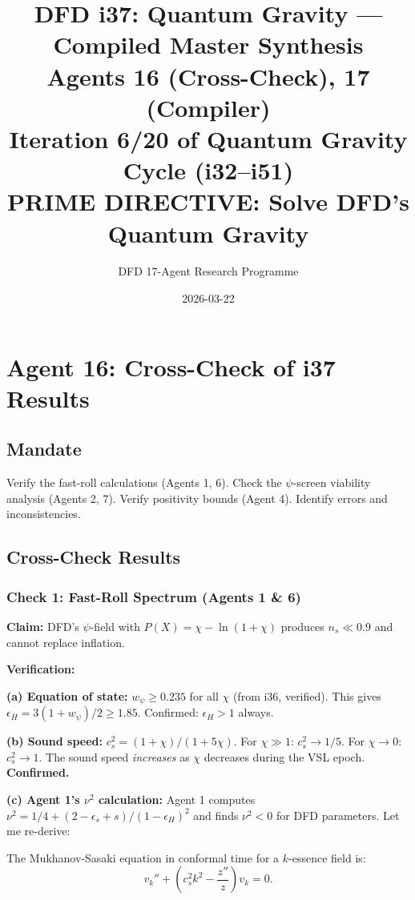 \documentclass[11pt,a4paper]{article}
\title{DFD i37: Quantum Gravity --- Compiled Master Synthesis\\[6pt]
\large Agents 16 (Cross-Check), 17 (Compiler)\\[6pt]
\normalsize Iteration 6/20 of Quantum Gravity Cycle (i32--i51)\\
PRIME DIRECTIVE: Solve DFD's Quantum Gravity}
\author{DFD 17-Agent Research Programme}
\date{2026-03-22}
\begin{document}
\maketitle
\tableofcontents
\newpage

\section{Agent 16: Cross-Check of i37 Results}
\label{sec:agent16}

\subsection{Mandate}

Verify the fast-roll calculations (Agents 1, 6). Check the $\psi$-screen viability analysis (Agents 2, 7). Verify positivity bounds (Agent 4). Identify errors and inconsistencies.

\subsection{Cross-Check Results}

\subsubsection{Check 1: Fast-Roll Spectrum (Agents 1 \& 6)}

\textbf{Claim:} DFD's $\psi$-field with $P(X) = \chi - \ln(1+\chi)$ produces $n_s \ll 0.9$ and cannot replace inflation.

\textbf{Verification:}

\textbf{(a) Equation of state:} $w_\psi \geq 0.235$ for all $\chi$ (from i36, verified). This gives $\epsilon_H = 3(1+w_\psi)/2 \geq 1.85$. Confirmed: $\epsilon_H > 1$ always.

\textbf{(b) Sound speed:} $c_s^2 = (1+\chi)/(1+5\chi)$. For $\chi \gg 1$: $c_s^2 \to 1/5$. For $\chi \to 0$: $c_s^2 \to 1$. The sound speed \emph{increases} as $\chi$ decreases during the VSL epoch. \textbf{Confirmed.}

\textbf{(c) Agent 1's $\nu^2$ calculation:} Agent 1 computes $\nu^2 = 1/4 + (2 - \epsilon_s + s)/(1-\epsilon_H)^2$ and finds $\nu^2 < 0$ for DFD parameters. Let me re-derive:

The Mukhanov-Sasaki equation in conformal time for a $k$-essence field is:
\begin{equation}
v_k'' + \left(c_s^2 k^2 - \frac{z''}{z}\right)v_k = 0.
\end{equation}
\end{document}
